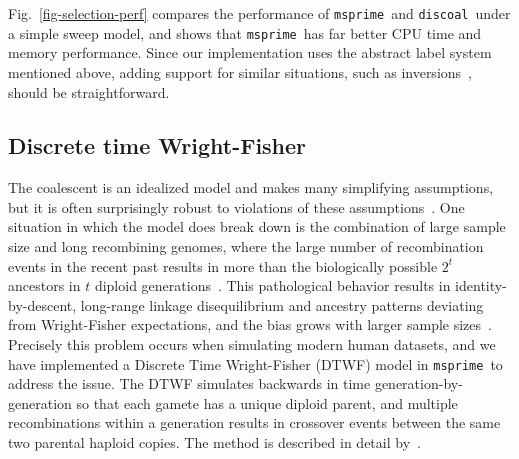 \documentclass[9pt,twocolumn,twoside,lineno]{gsajnl}
\newcommand{\msprime}[0]{\texttt{msprime}}
\newcommand{\discoal}[0]{\texttt{discoal}}
\begin{document}
Fig.~\ref{fig-selection-perf} compares the performance of \msprime\
and \discoal\ under a simple sweep model, and shows
that \msprime\ has far better
CPU time and memory performance.
Since our implementation uses the abstract label system mentioned above,
adding support for similar situations,
such as inversions~\citep{peischl2013sequential}, should be straightforward.

\subsection*{Discrete time Wright-Fisher}
The coalescent is an idealized model and makes many simplifying assumptions,
but it is often surprisingly robust to violations of these
assumptions~\citep{wakeley2012gene}. One situation in which the
model does break down is the combination of large sample size
and long recombining genomes, where the large
number of recombination events in the recent past results in
more than the biologically possible $2^t$ ancestors in
$t$ diploid generations~\citep{nelson2020accounting}.
This pathological behavior results in
identity-by-descent,
long-range linkage disequilibrium and ancestry patterns deviating from
Wright-Fisher expectations, and the bias grows with larger sample
sizes~\citep{wakeley2012gene,bhaskar2014distortion,nelson2020accounting}.
Precisely this problem occurs when simulating modern human datasets,
and we have implemented a Discrete Time Wright-Fisher (DTWF) model
in \msprime\ to address the issue. The DTWF simulates backwards in
time generation-by-generation so that each gamete has a unique
diploid parent, and multiple recombinations within a generation results in
crossover events between the same two parental haploid copies.
The method is described in detail by~\cite{nelson2020accounting}.
\end{document}
